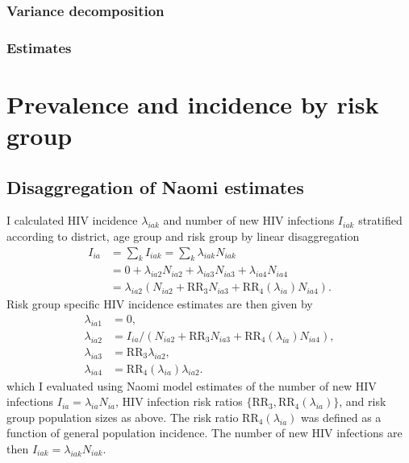 \documentclass[a4paper, nobind]{templates/ociamthesis}
\begin{document}
\hypertarget{variance-decomposition}{%
\subsubsection{Variance decomposition}\label{variance-decomposition}}

\hypertarget{estimates}{%
\subsubsection{Estimates}\label{estimates}}

\hypertarget{prevalence-and-incidence-by-risk-group}{%
\section{Prevalence and incidence by risk group}\label{prevalence-and-incidence-by-risk-group}}

\hypertarget{disaggregation-of-naomi-estimates}{%
\subsection{Disaggregation of Naomi estimates}\label{disaggregation-of-naomi-estimates}}

I calculated HIV incidence \(\lambda_{iak}\) and number of new HIV infections \(I_{iak}\) stratified according to district, age group and risk group by linear disaggregation
\begin{align}
    I_{ia} &= \sum_k I_{iak} = \sum_k \lambda_{iak}N_{iak} \\
    &= 0 + \lambda_{ia2} N_{ia2} + \lambda_{ia3} N_{ia3} + \lambda_{ia4} N_{ia4} \\
    &= \lambda_{ia2} \left(N_{ia2}  + \text{RR}_{3} N_{ia3} + \text{RR}_4(\lambda_{ia}) N_{ia4}  \right).
\end{align}
Risk group specific HIV incidence estimates are then given by
\begin{align}
    \lambda_{ia1} &= 0, \\
    \lambda_{ia2} &= I_{ia} / \left(N_{ia2} + \text{RR}_{3} N_{ia3} + \text{RR}_4(\lambda_{ia}) N_{ia4}\right), \\
    \lambda_{ia3} &= \text{RR}_{3} \lambda_{ia2}, \\
    \lambda_{ia4} &= \text{RR}_4(\lambda_{ia}) \lambda_{ia2}.
\end{align}
which I evaluated using Naomi model estimates of the number of new HIV infections \(I_{ia} = \lambda_{ia} N_{ia}\), HIV infection risk ratios \(\{\text{RR}_3, \text{RR}_4(\lambda_{ia})\}\), and risk group population sizes as above.
The risk ratio \(\text{RR}_4(\lambda_{ia})\) was defined as a function of general population incidence.
The number of new HIV infections are then \(I_{iak} = \lambda_{iak} N_{iak}\).
\end{document}
